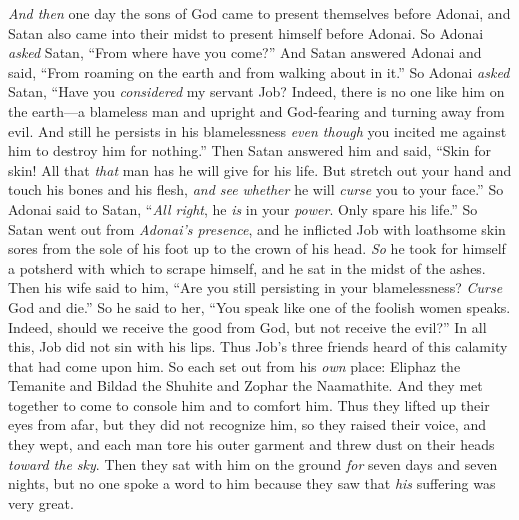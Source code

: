 \begin{biblechapter} %
 \textit{And then} one day the sons of God came to present themselves before Adonai, and Satan also came into their midst to present himself before Adonai.
\verse So Adonai \textit{asked} Satan, “From where have you come?” And Satan answered Adonai and said, “From roaming on the earth and from walking about in it.”
\verse So Adonai \textit{asked} Satan, “Have you \textit{considered} my servant Job? Indeed, there is no one like him on the earth—a blameless man and upright and God-fearing and turning away from evil. And still he persists in his blamelessness \textit{even though} you incited me against him to destroy him for nothing.”
\verse Then Satan answered him and said, “Skin for skin! All that \textit{that} man has he will give for his life.
\verse But stretch out your hand and touch his bones and his flesh, \textit{and see} \textit{whether} he will \textit{curse} you to your face.”
\verse So Adonai said to Satan, “\textit{All right}, he \textit{is} in your \textit{power}. Only spare his life.”
 So Satan went out from \textit{Adonai’s presence}, and he inflicted Job with loathsome skin sores from the sole of his foot up to the crown of his head.
\verse \textit{So} he took for himself a potsherd with which to scrape himself, and he sat in the midst of the ashes.
\verse Then his wife said to him, “Are you still persisting in your blamelessness? \textit{Curse} God and die.”
\verse So he said to her, “You speak like one of the foolish women speaks. Indeed, should we receive the good from God, but not receive the evil?” In all this, Job did not sin with his lips.
\verse Thus Job’s three friends heard of this calamity that had come upon him. So each set out from his \textit{own} place: Eliphaz the Temanite and Bildad the Shuhite and Zophar the Naamathite. And they met together to come to console him and to comfort him.
\verse Thus they lifted up their eyes from afar, but they did not recognize him, so they raised their voice, and they wept, and each man tore his outer garment and threw dust on their heads \textit{toward the sky}.
\verse Then they sat with him on the ground \textit{for} seven days and seven nights, but no one spoke a word to him because they saw that \textit{his} suffering was very great.
\end{biblechapter}

